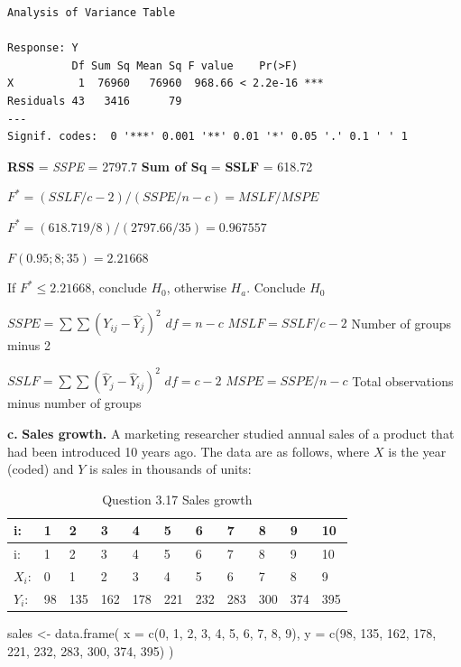 \documentclass[
  letterpaper,
  DIV=11,
  numbers=noendperiod]{scrartcl}
\newenvironment{Shaded}{\begin{snugshade}}{\end{snugshade}}
\newcommand{\AttributeTok}[1]{\textcolor[rgb]{0.40,0.45,0.13}{#1}}
\newcommand{\DecValTok}[1]{\textcolor[rgb]{0.68,0.00,0.00}{#1}}
\newcommand{\FunctionTok}[1]{\textcolor[rgb]{0.28,0.35,0.67}{#1}}
\newcommand{\NormalTok}[1]{\textcolor[rgb]{0.00,0.23,0.31}{#1}}
\newcommand{\OtherTok}[1]{\textcolor[rgb]{0.00,0.23,0.31}{#1}}
\begin{document}
\begin{verbatim}
Analysis of Variance Table

Response: Y
          Df Sum Sq Mean Sq F value    Pr(>F)    
X          1  76960   76960  968.66 < 2.2e-16 ***
Residuals 43   3416      79                      
---
Signif. codes:  0 '***' 0.001 '**' 0.01 '*' 0.05 '.' 0.1 ' ' 1
\end{verbatim}

\textbf{RSS} = \emph{SSPE} = 2797.7 \textbf{Sum of Sq} = \textbf{SSLF} =
618.72

\(F^{*} = (SSLF/c - 2) / (SSPE / n - c) = MSLF / MSPE\)

\(F^{*} = (618.719/8) / (2797.66 / 35) = 0.967557\)

\(F(0.95; 8; 35) = 2.21668\)

If \(F^{*} \leq 2.21668\), conclude \(H_{0}\), otherwise \(H_{a}\).
Conclude \(H_{0}\)

\(SSPE = \sum\sum (Y_{ij} - \hat Y_{j})^2\) \(df = n - c\)
\(MSLF = SSLF/c - 2\) Number of groups minus 2

\(SSLF = \sum\sum (\hat Y_{j} - \hat Y_{ij})^2\) \(df = c - 2\)
\(MSPE = SSPE/n - c\) Total observations minus number of groups

\textbf{c.} \textbf{Sales growth.} A marketing researcher studied annual
sales of a product that had been introduced 10 years ago. The data are
as follows, where \(X\) is the year (coded) and \(Y\) is sales in
thousands of units:

\begin{longtable}[]{@{}lllllllllll@{}}
\caption{Question 3.17 Sales growth}\tabularnewline
\toprule()
i: & 1 & 2 & 3 & 4 & 5 & 6 & 7 & 8 & 9 & 10 \\
\midrule()
\endfirsthead
\toprule()
i: & 1 & 2 & 3 & 4 & 5 & 6 & 7 & 8 & 9 & 10 \\
\midrule()
\endhead
\(X_{i}\): & 0 & 1 & 2 & 3 & 4 & 5 & 6 & 7 & 8 & 9 \\
\(Y_{i}\): & 98 & 135 & 162 & 178 & 221 & 232 & 283 & 300 & 374 & 395 \\
\bottomrule()
\end{longtable}

\begin{Shaded}
\begin{Highlighting}[]
\NormalTok{sales }\OtherTok{\textless{}{-}}
  \FunctionTok{data.frame}\NormalTok{(}
  \AttributeTok{x =} \FunctionTok{c}\NormalTok{(}\DecValTok{0}\NormalTok{, }\DecValTok{1}\NormalTok{, }\DecValTok{2}\NormalTok{, }\DecValTok{3}\NormalTok{, }\DecValTok{4}\NormalTok{, }\DecValTok{5}\NormalTok{, }\DecValTok{6}\NormalTok{, }\DecValTok{7}\NormalTok{, }\DecValTok{8}\NormalTok{, }\DecValTok{9}\NormalTok{),}
  \AttributeTok{y =} \FunctionTok{c}\NormalTok{(}\DecValTok{98}\NormalTok{, }\DecValTok{135}\NormalTok{, }\DecValTok{162}\NormalTok{, }\DecValTok{178}\NormalTok{, }\DecValTok{221}\NormalTok{, }\DecValTok{232}\NormalTok{, }\DecValTok{283}\NormalTok{, }\DecValTok{300}\NormalTok{, }\DecValTok{374}\NormalTok{, }\DecValTok{395}\NormalTok{)}
\NormalTok{  )}
\end{Highlighting}
\end{Shaded}
\end{document}
